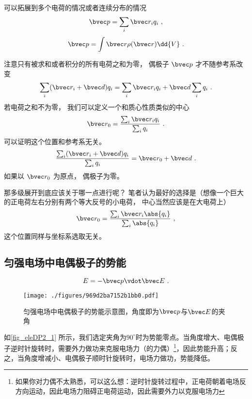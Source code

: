 

可以拓展到多个电荷的情况或者连续分布的情况
\begin{equation}
\bvec p = \sum_i \bvec r_i q_i~,
\end{equation}
\begin{equation}
\bvec p = \int \bvec r \rho(\bvec r) \dd{V}~.
\end{equation}

注意只有被求和或者积分的所有电荷之和为零， 偶极子 $\bvec p$ 才不随参考系改变
\begin{equation}
\sum_i (\bvec r_i + \bvec d) q_i = \sum_i \bvec r_i q_i + \bvec d \sum_i q_i~.
\end{equation}
若电荷之和不为零， 我们可以定义一个和质心性质类似的中心
\begin{equation}
\bvec r_0 = \frac{\sum_i \bvec r_i q_i}{\sum_i q_i}~.
\end{equation}
可以证明这个位置和参考系无关。
\begin{equation}
\frac{\sum_i (\bvec r_i + \bvec d) q_i}{\sum_i q_i} = \bvec r_0 + \bvec d~.
\end{equation}
如果以 $\bvec r_0$ 为原点， 偶极子为零。

那多级展开到底应该关于哪一点进行呢？ 笔者认为最好的选择是（想像一个巨大的正电荷左右分别有两个等大反号的小电荷， 中心当然应该是在大电荷上）
\begin{equation}
\bvec r_0 = \frac{\sum_i \bvec r_i \abs{q_i}}{\sum_i \abs{q_i}}~,
\end{equation}
这个位置同样与坐标系选取无关。

\subsection{匀强电场中电偶极子的势能}
\begin{equation}\label{eq_eleDP2_1}
E = -\bvec p \vdot \bvec E~.
\end{equation}
\begin{figure}[ht]
\centering
\texttt{[image: ./figures/969d2ba7152b1bb0.pdf]}
\caption{匀强电场中电偶极子的势能示意图，角度即为$\bvec p$与$\bvec E$的夹角} \label{fig_eleDP2_1}
\end{figure}
如\autoref{fig_eleDP2_1} 所示，我们选定夹角为$90^\circ$时为势能零点。当角度增大、电偶极子逆时针旋转时，需要外力做功来克服电场力（的力偶）\footnote{如果你对力偶不太熟悉，可以这么想：逆时针旋转过程中，正电荷朝着电场反方向运动，因此电场力阻碍正电荷运动，因此需要外力以克服电场力}，因此势能升高；反之，当角度增减小、电偶极子顺时针旋转时，电场力做功，势能降低。
